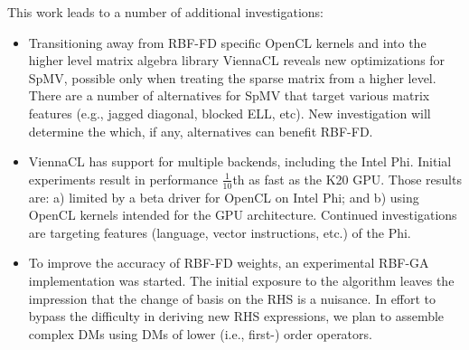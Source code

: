 \documentclass{report}
\begin{document}
This work leads to a number of additional investigations:
\begin{itemize}
\item Transitioning away from RBF-FD specific OpenCL kernels and into the higher level matrix algebra library ViennaCL reveals new optimizations for SpMV, possible only when treating the sparse matrix from a higher level. There are a number of alternatives for SpMV that target various matrix features (e.g., jagged diagonal, blocked ELL, etc). New investigation will determine the which, if any, alternatives can benefit RBF-FD. 

\item ViennaCL has support for multiple backends, including the Intel Phi. Initial experiments result in performance $\frac{1}{10}$th as fast as the K20 GPU. Those results are: a) limited by a beta driver for OpenCL on Intel Phi; and b) using OpenCL kernels intended for the GPU architecture. Continued investigations are targeting features (language, vector instructions, etc.) of the Phi. 
\item To improve the accuracy of RBF-FD weights, an experimental RBF-GA implementation was started. The initial exposure to the algorithm leaves the impression that the change of basis on the RHS is a nuisance. In effort to bypass the difficulty in deriving new RHS expressions, we plan to assemble complex DMs using DMs of lower (i.e., first-) order operators.
\end{itemize}



\ifstandalone


\end{document}
